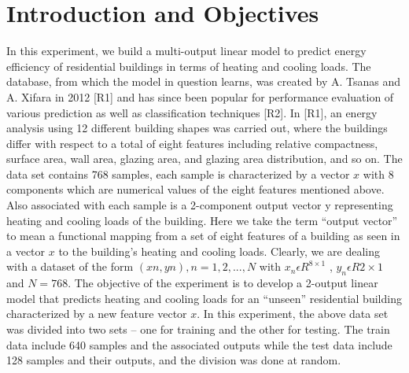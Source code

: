 \section{Introduction and Objectives}
\label{sect:introduction}
In this experiment, we build a multi-output linear model to predict energy efficiency of residential
buildings in terms of heating and cooling loads. The database, from which the model in question
learns, was created by A. Tsanas and A. Xifara in 2012 [R1] and has since been popular for
performance evaluation of various prediction as well as classification techniques [R2].
In [R1], an energy analysis using 12 different building shapes was carried out, where the buildings
differ with respect to a total of eight features including relative compactness, surface area,   wall
area,   glazing area, and glazing area distribution, and so on. The data set contains 768 samples,
each sample is characterized by a vector $x$ with 8 components which are numerical values of the
eight features mentioned above. Also associated with each sample is a 2-component output
vector y representing heating and cooling loads of the building. Here we take the term “output
vector” to mean a functional mapping from a set of eight features of a building as seen in a vector
$x$ to the building’s heating and cooling loads.
Clearly, we are dealing with a dataset of the form ${(x n , y n ), n = 1, 2, ..., N}$ with $x_n \epsilon R^{8\times1}$ ,
$y_n \epsilon R{2\times1}$ and $N = 768$. The objective of the experiment is to develop a 2-output linear model that
predicts heating and cooling loads for an ``unseen'' residential building characterized by a new
feature vector $x$.
In this experiment, the above data set was divided into two sets – one for training and the other
for testing. The train data include 640 samples and the associated outputs while the test data
include 128 samples and their outputs, and the division was done at random.